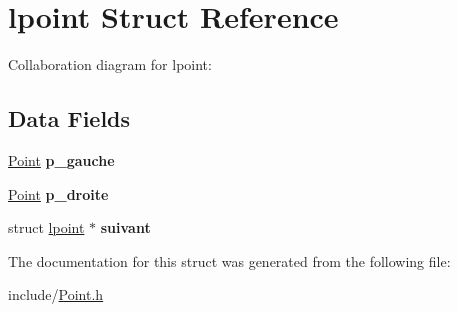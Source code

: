 \hypertarget{structlpoint}{\section{lpoint Struct Reference}
\label{structlpoint}
}


Collaboration diagram for lpoint\+:
\subsection*{Data Fields}
\begin{DoxyCompactItemize}
\item 
\hypertarget{structlpoint_a27da4588aade0d89965ebc52c880f2f7}{\hyperlink{struct_vecteur}{Point} {\bfseries p\+\_\+gauche}}\label{structlpoint_a27da4588aade0d89965ebc52c880f2f7}

\item 
\hypertarget{structlpoint_a8da2e0638d661d65f5a3dc23c6af2d7e}{\hyperlink{struct_vecteur}{Point} {\bfseries p\+\_\+droite}}\label{structlpoint_a8da2e0638d661d65f5a3dc23c6af2d7e}

\item 
\hypertarget{structlpoint_a84b9e04e1926a9bc3a9f304ab0e6d185}{struct \hyperlink{structlpoint}{lpoint} $\ast$ {\bfseries suivant}}\label{structlpoint_a84b9e04e1926a9bc3a9f304ab0e6d185}

\end{DoxyCompactItemize}


The documentation for this struct was generated from the following file\+:\begin{DoxyCompactItemize}
\item 
include/\hyperlink{_point_8h}{Point.\+h}\end{DoxyCompactItemize}
